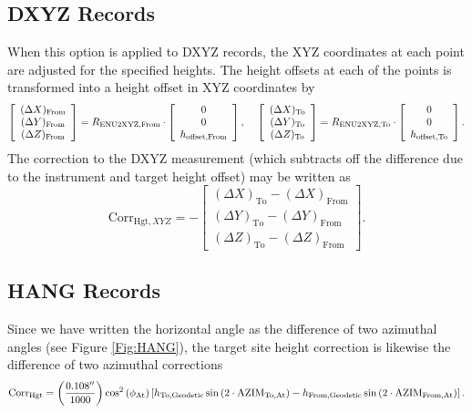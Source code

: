 \subsection{DXYZ Records}
When this option is applied to DXYZ records, the XYZ coordinates at each point are adjusted for the specified heights.  The height offsets at each of the points is transformed into a height offset in XYZ coordinates by
\begin{equation}
\left[\begin{array}{c}(\Delta X)_{\text{From}}\\(\Delta Y)_{\text{From}}\\(\Delta Z)_{\text{From}}\end{array}\right]=R_{\text{ENU2XYZ},{\text{From}}}\cdot\left[\begin{array}{c}0\\0\\h_{\text{offset},\text{From}}\end{array}\right],\hspace*{4mm}\left[\begin{array}{c}(\Delta X)_{\text{To}}\\(\Delta Y)_{\text{To}}\\(\Delta Z)_{\text{To}}\end{array}\right]=R_{\text{ENU2XYZ},{\text{To}}}\cdot\left[\begin{array}{c}0\\0\\h_{\text{offset},\text{To}}\end{array}\right].
\end{equation}
The correction to the DXYZ measurement (which subtracts off the difference due to the instrument and target height offset) may be written as
\begin{equation}
\text{Corr}_{\text{Hgt},XYZ}=-\left[\begin{array}{c}\left(\Delta X\right)_{\text{To}}-\left(\Delta X\right)_{\text{From}}\\\left(\Delta Y\right)_{\text{To}}-\left(\Delta Y\right)_{\text{From}}\\\left(\Delta Z\right)_{\text{To}}-\left(\Delta Z\right)_{\text{From}}\end{array}\right].
\end{equation}
\subsection{HANG Records}
Since we have written the horizontal angle as the difference of two azimuthal angles (see Figure \ref{Fig:HANG}), the target site height correction is likewise the difference of two azimuthal corrections
\begin{equation}
\text{Corr}_{\text{Hgt}}=\left(\frac{0.108''}{1000}\right)\cos^2\left(\phi_{\text{At}}\right)\left[h_{\text{To,Geodetic}}\sin\left(2\cdot\text{AZIM}_{\text{To,At}}\right)-h_{\text{From,Geodetic}}\sin\left(2\cdot\text{AZIM}_{\text{From,At}}\right)\right].
\end{equation}
